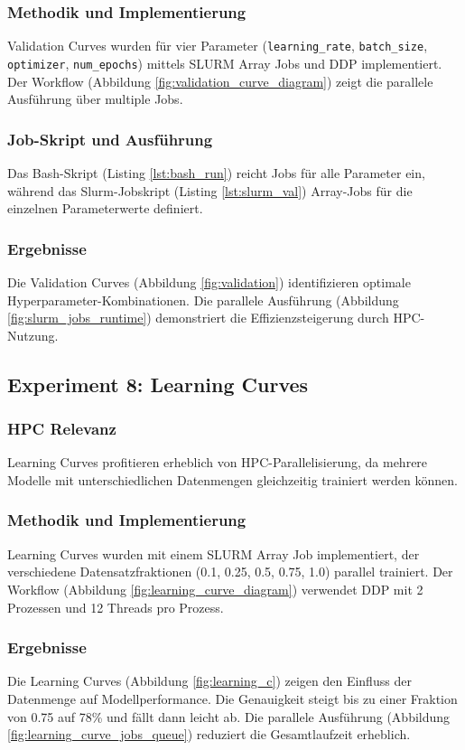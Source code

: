 \documentclass{article}
\begin{document}
\subsubsection{Methodik und Implementierung}
Validation Curves wurden für vier Parameter (\texttt{learning\_rate}, \texttt{batch\_size}, \texttt{optimizer}, \texttt{num\_epochs}) mittels 
SLURM Array Jobs und DDP implementiert. Der Workflow (Abbildung \ref{fig:validation_curve_diagram}) zeigt die parallele Ausführung über multiple 
Jobs.

\subsubsection{Job-Skript und Ausführung}
Das Bash-Skript (Listing \ref{lst:bash_run}) reicht Jobs für alle Parameter ein, während das Slurm-Jobskript (Listing \ref{lst:slurm_val}) 
Array-Jobs für die einzelnen Parameterwerte definiert.

\subsubsection{Ergebnisse}
Die Validation Curves (Abbildung \ref{fig:validation}) identifizieren optimale Hyperparameter-Kombinationen. Die parallele Ausführung 
(Abbildung \ref{fig:slurm_jobs_runtime}) demonstriert die Effizienzsteigerung durch HPC-Nutzung.

\subsection{Experiment 8: Learning Curves}
\subsubsection{HPC Relevanz}
Learning Curves profitieren erheblich von HPC-Parallelisierung, da mehrere Modelle mit unterschiedlichen Datenmengen gleichzeitig trainiert werden können. 
\subsubsection{Methodik und Implementierung}
Learning Curves wurden mit einem SLURM Array Job implementiert, der verschiedene Datensatzfraktionen (0.1, 0.25, 0.5, 0.75, 1.0) parallel 
trainiert. Der Workflow (Abbildung \ref{fig:learning_curve_diagram}) verwendet DDP mit 2 Prozessen und 12 Threads pro Prozess.

\subsubsection{Ergebnisse}
Die Learning Curves (Abbildung \ref{fig:learning_c}) zeigen den Einfluss der Datenmenge auf Modellperformance. Die Genauigkeit steigt bis 
zu einer Fraktion von 0.75 auf 78\% und fällt dann leicht ab. Die parallele Ausführung (Abbildung \ref{fig:learning_curve_jobs_queue}) reduziert 
die Gesamtlaufzeit erheblich.
\end{document}
